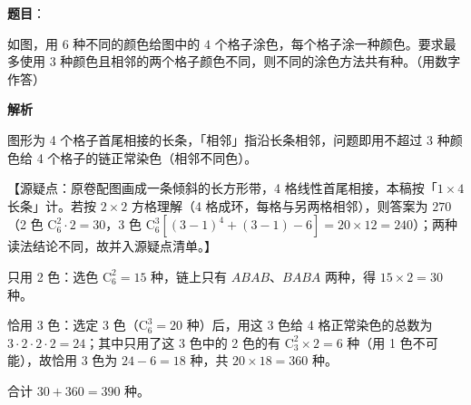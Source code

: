\begin{answer}

\textbf{题目}：

如图，用 $6$ 种不同的颜色给图中的 $4$ 个格子涂色，每个格子涂一种颜色。要求最多使用 $3$ 种颜色且相邻的两个格子颜色不同，则不同的涂色方法共有\gkblank{}种。（用数字作答）
\nopagebreak[4]
\begin{center}\end{center}
\nopagebreak[4]
\textbf{解析}

图形为 4 个格子首尾相接的长条，「相邻」指沿长条相邻，问题即用不超过 3 种颜色给 4 个格子的链正常染色（相邻不同色）。

【源疑点：原卷配图画成一条倾斜的长方形带，4 格线性首尾相接，本稿按「$1\times4$ 长条」计。若按 $2\times2$ 方格理解（4 格成环，每格与另两格相邻），则答案为 $270$（2 色 $\mathrm C_6^2\cdot2=30$，3 色 $\mathrm C_6^3\left[(3-1)^4+(3-1)-6\right]=20\times12=240$）；两种读法结论不同，故并入源疑点清单。】

只用 2 色：选色 $\mathrm C_6^2=15$ 种，链上只有 $ABAB$、$BABA$ 两种，得 $15\times2=30$ 种。

恰用 3 色：选定 3 色（$\mathrm C_6^3=20$ 种）后，用这 3 色给 4 格正常染色的总数为 $3\cdot2\cdot2\cdot2=24$；其中只用了这 3 色中的 2 色的有 $\mathrm C_3^2\times2=6$ 种（用 1 色不可能），故恰用 3 色为 $24-6=18$ 种，共 $20\times18=360$ 种。

合计 $30+360=390$ 种。


\end{answer}
